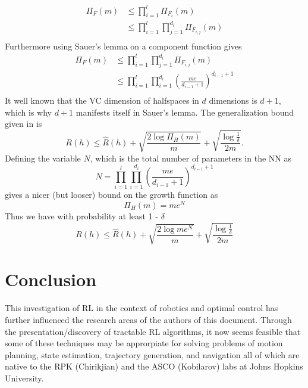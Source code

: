 \documentclass{article} %
\begin{document}
\begin{align*}
\Pi_F(m) &\leq \prod_{i=1}^l \Pi_{F_i}(m)\\
& \leq \prod_{i=1}^l\prod_{j=1}^{d_i} \Pi_{F_{i,j}}(m)\\
\end{align*}
Furthermore using Sauer's lemma on a component function gives
\begin{align*}
\Pi_F(m)& \leq \prod_{i=1}^l\prod_{j=1}^{d_i} \Pi_{F_{i,j}}(m)\\
& \leq \prod_{i=1}^l\prod_{i=1}^{d_i}(\frac{me}{d_{i-1}+1})^{d_{i-1}+1}\\
\end{align*}
It well known that the VC dimension of halfspaces in $d$ dimensions is $d +1$, which is why $d+1$ manifests itself in Sauer's lemma.
The generalization bound given in \cite{mohri} is 
$$
R(h) \leq \widehat{R}(h) + \sqrt{\frac{2\log{\Pi_H{(m)}}}{m}} + \sqrt{\frac{\log{\frac{1}{\delta}}}{2m}}.
$$
Defining the variable $N$, which is the total number of parameters in the NN as 
$$
N = \prod_{i=1}^l\prod_{i=1}^{d_i}(\frac{me}{d_{i-1}+1})^{d_{i-1}+1}
$$ 
gives a nicer (but looser) bound on the growth function as
$$
\Pi_H{(m)} = me^N
$$
Thus we have with probability at least 1 - $\delta$
$$
R(h) \leq \widehat{R}(h) + \sqrt{\frac{2\log{me^N}}{m}} + \sqrt{\frac{\log{\frac{1}{\delta}}}{2m}}
$$

\section{Conclusion}
This investigation of RL in the context of robotics and optimal control has further influenced the research areas of the authors of this document. Through the presentation/discovery of tractable RL algorithms, it now seems feasible that some of these techniques may be approrpiate for solving problems of motion planning, state estimation, trajectory generation, and navigation all of which are native to the RPK (Chirikjian) and the ASCO (Kobilarov) labs at Johns Hopkins University.


\nocite{yang_multiagent_2004}
\nocite{kim_autonomous_2003}
\nocite{mohri_foundations_2012}

\newpage
{}





\end{document}
